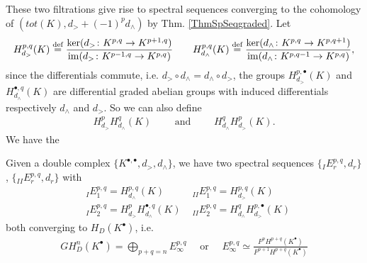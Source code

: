 \documentclass[../main.tex]{subfiles}
\begin{document}
\vspace{10pt}These two filtrations give rise to spectral sequences converging to the cohomology of $(tot(K),d_>+ (-1)^p d_\wedge)$ by Thm. \ref{ThmSpSeqgraded}.
Let
\begin{align*}
    H_{d_>}^{p,q}(K) \stackrel{\text{def}}{=} \frac{\ker(d_> \colon K^{p,q} \to K^{p+1,q})}{\operatorname{im} (d_> \colon K^{p-1,q} \to K^{p,q})} \qquad
     H_{d_\wedge}^{p,q}(K) \stackrel{\text{def}}{=} \frac{\ker(d_\wedge \colon K^{p,q} \to K^{p,q+1})}{\operatorname{im} (d_\wedge \colon K^{p,q-1} \to K^{p,q})},
\end{align*}
since the differentials commute, i.e. $d_> \circ d_\wedge = d_\wedge \circ d_>$, the groups $ H_{d_>}^{p,\bullet}(K)$ and $  H_{d_\wedge}^{\bullet,q}(K)$ are differential graded abelian groups with induced differentials respectively $d_\wedge $ and $d_>$. So we can also define 
\begin{align*}
    H_{d_>}^{p}H^q_{d_\wedge}(K)  \qquad \text{ and } \qquad 
     H_{d_\wedge}^{q}H^p_{d_>}(K).
\end{align*}
We have the
\begin{theorem} \label{doublecomplexSpSeq}
    Given a double complex $\{K^{\bullet,\bullet}, d_>, d_\wedge \}$, we have two spectral sequences $\{{}_IE_r^{p,q},d_r \}$, $\{{}_{II}E_r^{p,q},d_r \}$ with
    \begin{align*}
    &{}_IE_1^{p,q}=H^{p,q}_{d_\wedge}(K) \qquad  &{}_{II}E_1^{p,q}=H^{p,q}_{d_>}(K) \\
&{}_IE_2^{p,q}=H^p_{d_>}H^{\bullet,q}_{d_\wedge}(K) 
&{}_{II}E_2^{p,q}=H^q_{d_\wedge}H^{p,\bullet}_{d_>}(K)
    \end{align*}
    both converging to $H_D(K^\bullet)$, i.e.
    \begin{align*}
        GH^n_D(K^\bullet) = \bigoplus_{p+q=n} E_\infty^{p,q} \quad \text{ or } \quad E_\infty^{p,q} \simeq \frac{F^p H^{p+q}(K^\bullet)}{F^{p+1} H^{p+q}(K^\bullet)}
    \end{align*}
\end{theorem}
\end{document}
